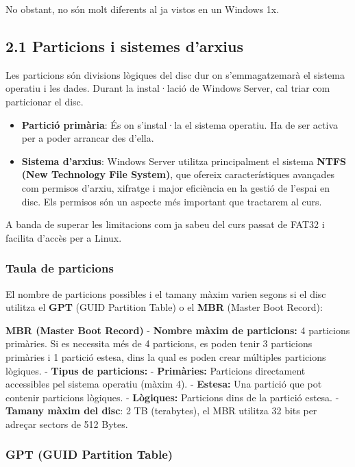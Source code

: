 \documentclass[
  a4paper,
]{article}
\begin{document}
No obstant, no són molt diferents al ja vistos en un Windows 1x.

\subsection{2.1 Particions i sistemes
d'arxius}\label{particions-i-sistemes-darxius}

Les particions són divisions lògiques del disc dur on s'emmagatzemarà el
sistema operatiu i les dades. Durant la instal·lació de Windows Server,
cal triar com particionar el disc.

\begin{itemize}
\item
  \textbf{Partició primària}: És on s'instal·la el sistema operatiu. Ha
  de ser activa per a poder arrancar des d'ella.
\item
  \textbf{Sistema d'arxius}: Windows Server utilitza principalment el
  sistema \textbf{NTFS (New Technology File System)}, que ofereix
  característiques avançades com permisos d'arxiu, xifratge i major
  eficiència en la gestió de l'espai en disc. Els permisos són un
  aspecte més important que tractarem al curs.
\end{itemize}

A banda de superar les limitacions com ja sabeu del curs passat de FAT32
i facilita d'accès per a Linux.

\subsubsection{Taula de particions}\label{taula-de-particions}

El nombre de particions possibles i el tamany màxim varien segons si el
disc utilitza el \textbf{GPT} (GUID Partition Table) o el \textbf{MBR}
(Master Boot Record):

\textbf{MBR (Master Boot Record)} - \textbf{Nombre màxim de particions:}
4 particions primàries. Si es necessita més de 4 particions, es poden
tenir 3 particions primàries i 1 partició estesa, dins la qual es poden
crear múltiples particions lògiques. - \textbf{Tipus de particions:} -
\textbf{Primàries:} Particions directament accessibles pel sistema
operatiu (màxim 4). - \textbf{Estesa:} Una partició que pot contenir
particions lògiques. - \textbf{Lògiques:} Particions dins de la partició
estesa. - \textbf{Tamany màxim del disc}: 2 TB (terabytes), el MBR
utilitza 32 bits per adreçar sectors de 512 Bytes.

\subsubsection{\texorpdfstring{\textbf{GPT (GUID Partition
Table)}}{GPT (GUID Partition Table)}}\label{gpt-guid-partition-table}
\end{document}

